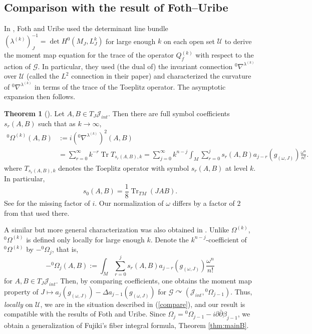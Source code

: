 \documentclass[12pt,reqno,a4paper]{amsart}
\numberwithin{equation}{section}
\theoremstyle{definition}
\newtheorem{theorem}{Theorem}
\theoremstyle{remark}
\begin{document}
\subsection{Comparison with the result of Foth--Uribe}\label{FU}

In \cite{foth2007manifold}, Foth and Uribe used the determinant line bundle $(\lambda^{(k)})^{-1}_J=\det H^0(M_J,L_J^k)$ for large enough $k$ on each open set $\mathcal{U}$ to derive the moment map equation for the trace of the operator $Q^{(k)}_f$ with respect to the action of $\mathcal{G}$. In particular, they used (the dual of) the invariant connection ${}^0\nabla^{\lambda^{(k)}}$ over $\mathcal{U}$ (called the $L^2$ connection in their paper) and characterized the curvature of ${}^0\nabla^{\lambda^{(k)}}$ in terms of the trace of the Toeplitz operator. The asymptotic expansion then follows. 
\begin{theorem}[]
Let $A,B\in T_J\mathcal{J}_{int}$. Then there are full symbol coefficients $s_r(A,B)$ such that as $k\rightarrow\infty$,
\begin{align*}
{}^0\Omega^{(k)}(A,B)&:=i\left( {}^0\nabla^{\lambda^{(k)}}\right)^2(A,B)\\
&=\sum_{r=0}^\infty k^{-r}\operatorname{Tr}T_{s_r(A,B),k}=\sum_{j=0}^{\infty} k^{n-j}\int_M \sum_{r=0}^j s_r(A,B)a_{j-r}(g_{(\omega,J)})\frac{\omega^n}{n!}.
\end{align*}
where $T_{s_r(A,B),k}$ denotes the Toeplitz operator with symbol $s_r(A,B)$ at level $k$. In particular, 
\begin{equation*}
s_0(A,B)=\frac{1}{8}\operatorname{Tr}_{TM}(JAB).   
\end{equation*}
See \cite[Corollary A.7]{foth2007manifold} for the missing factor of $i$. Our normalization of $\omega$ differs by a factor of $2$ from that used there.
\end{theorem}
A similar but more general characterization was also obtained in \cite{ma2023superconnection}. Unlike $\Omega^{(k)}$, ${}^0\Omega^{(k)}$ is defined only locally for large enough $k$. Denote the $k^{n-j}$-coefficient of ${}^0\Omega^{(k)}$ by $-{}^0\Omega_j$, that is, 
\begin{equation*}
-{}^0\Omega_j(A,B):=\int_M \sum_{r=0}^j s_r(A,B)a_{j-r}(g_{(\omega,J)})\frac{\omega^n}{n!}
\end{equation*}
for $A,B\in T_J\mathcal{J}_{int}$. Then, by comparing coefficients, one obtains the moment map property of $J \mapsto a_j(g_{(\omega,J)})-\Delta a_{j-1}(g_{(\omega,J)})$ for $\mathcal{G}\curvearrowright (\mathcal{J}_{int},{}^0\Omega_{j-1})$. Thus, \textit{locally} on $\mathcal{U}$, we are in the situation described in (\ref{compare}), and our result is compatible with the results of Foth and Uribe. Since $\Omega_j={}^0\Omega_{j-1}-i\partial\bar{\partial}\beta_{j-1}$, we obtain a generalization of Fujiki's fiber integral formula, Theorem \ref{thm:mainB}.
\end{document}
